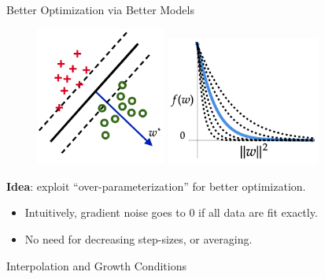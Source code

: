 \documentclass[mathserif,notheorems, hyperref={colorlinks, citecolor=blue, urlcolor=blue, linkcolor=blue}]{beamer}
\begin{document}
\begin{frame}{Better Optimization via Better Models}

	\begin{figure}
		\centering
		\includegraphics[width=0.38\textwidth]{figures/separable}
		\hspace{0.2em}
		\includegraphics[width=0.45\textwidth]{figures/loss_fn}
	\end{figure}
	\vspace{0.2em}

	\begin{center}
		\large \textbf{Idea}: exploit ``over-parameterization'' for better optimization.
	\end{center}
	\begin{itemize}
		\item Intuitively, gradient noise goes to $0$ if all data are fit exactly.
		\item No need for decreasing step-sizes, or averaging.
	\end{itemize}

\end{frame}



\begin{frame}
	\begin{center}
		\huge Interpolation and Growth Conditions
	\end{center}
\end{frame}
\end{document}
